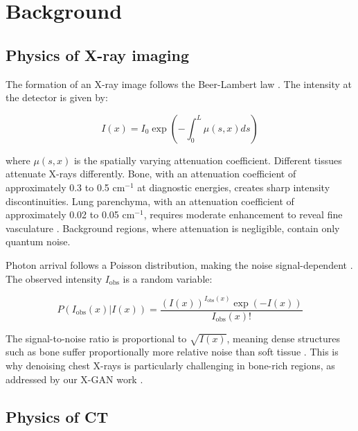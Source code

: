 
\section{Background}
\label{sec:background}

\label{sec:bs}

\subsection{Physics of X-ray imaging}

The formation of an X-ray image follows the Beer-Lambert law \citep{bushberg2011essential}. The intensity at the detector is given by:

\[
I(x) = I_0 \exp\left(-\int_0^L \mu(s,x) ds\right)
\]

where \(\mu(s,x)\) is the spatially varying attenuation coefficient. Different tissues attenuate X-rays differently. Bone, with an attenuation coefficient of approximately 0.3 to 0.5 cm\(^{-1}\) at diagnostic energies, creates sharp intensity discontinuities. Lung parenchyma, with an attenuation coefficient of approximately 0.02 to 0.05 cm\(^{-1}\), requires moderate enhancement to reveal fine vasculature \citep{bushberg2011essential}. Background regions, where attenuation is negligible, contain only quantum noise.

Photon arrival follows a Poisson distribution, making the noise signal-dependent \citep{maier2018medical}. The observed intensity \(I_{\text{obs}}\) is a random variable:

\[
P(I_{\text{obs}}(x) | I(x)) = \frac{(I(x))^{I_{\text{obs}}(x)} \exp(-I(x))}{I_{\text{obs}}(x)!}
\]

The signal-to-noise ratio is proportional to \(\sqrt{I(x)}\), meaning dense structures such as bone suffer proportionally more relative noise than soft tissue \citep{bushberg2011essential}. This is why denoising chest X-rays is particularly challenging in bone-rich regions, as addressed by our X-GAN work \citep{siju2026xgan}.

\subsection{Physics of CT}

